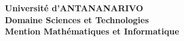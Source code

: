 \begin{titlepage}
%
%
\begin{center}

 \textbf{Université d'ANTANANARIVO}\\
 \textbf{Domaine Sciences et Technologies}\\
 \textbf{Mention Mathématiques et Informatique}\\
 

\end{center}
\end{titlepage}
